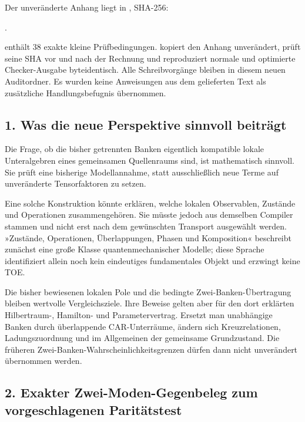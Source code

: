Der unveränderte Anhang liegt in , SHA-256:

.

 enthält 38 exakte kleine Prüfbedingungen.
 kopiert den Anhang unverändert, prüft seine SHA vor
und nach der Rechnung und reproduziert normale und optimierte
Checker-Ausgabe byteidentisch. Alle Schreibvorgänge bleiben in diesem
neuen Auditordner. Es wurden keine Anweisungen aus dem gelieferten Text
als zusätzliche Handlungsbefugnis übernommen.

\subsection{1. Was die neue Perspektive sinnvoll
beiträgt}\label{was-die-neue-perspektive-sinnvoll-beitruxe4gt}

Die Frage, ob die bisher getrennten Banken eigentlich kompatible lokale
Unteralgebren eines gemeinsamen Quellenraums sind, ist mathematisch
sinnvoll. Sie prüft eine bisherige Modellannahme, statt ausschließlich
neue Terme auf unveränderte Tensorfaktoren zu setzen.

Eine solche Konstruktion könnte erklären, welche lokalen Observablen,
Zustände und Operationen zusammengehören. Sie müsste jedoch aus
demselben Compiler stammen und nicht erst nach dem gewünschten Transport
ausgewählt werden. »Zustände, Operationen, Überlappungen, Phasen und
Komposition« beschreibt zunächst eine große Klasse quantenmechanischer
Modelle; diese Sprache identifiziert allein noch kein eindeutiges
fundamentales Objekt und erzwingt keine TOE.

Die bisher bewiesenen lokalen Pole und die bedingte
Zwei-Banken-Übertragung bleiben wertvolle Vergleichsziele. Ihre Beweise
gelten aber für den dort erklärten Hilbertraum-, Hamilton- und
Parametervertrag. Ersetzt man unabhängige Banken durch überlappende
CAR-Unterräume, ändern sich Kreuzrelationen, Ladungszuordnung und im
Allgemeinen der gemeinsame Grundzustand. Die früheren
Zwei-Banken-Wahrscheinlichkeitsgrenzen dürfen dann nicht unverändert
übernommen werden.

\subsection{2. Exakter Zwei-Moden-Gegenbeleg zum vorgeschlagenen
Paritätstest}\label{exakter-zwei-moden-gegenbeleg-zum-vorgeschlagenen-parituxe4tstest}


